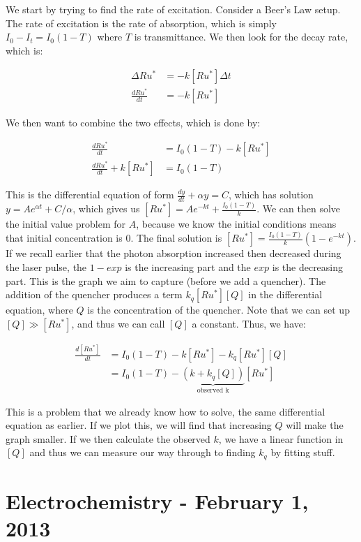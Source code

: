 \documentclass{report}
\begin{document}
We start by trying to find the rate of excitation. Consider a Beer's Law setup. The rate of excitation is the rate of absorption, which is simply $I_0 - I_t = I_0(1-T)$ where $T$ is transmittance. We then look for the decay rate, which is:

\begin{align*}
\Delta Ru^* &= -k[Ru^*]\Delta t\\
\frac{dRu^*}{dt} &= -k[Ru^*]
\end{align*}

We then want to combine the two effects, which is done by:

\begin{align*}
\frac{dRu^*}{dt} &= I_0(1-T) - k[Ru^*]\\
\frac{dRu^*}{dt} + k[Ru^*] &= I_0(1-T)
\end{align*}

This is the differential equation of form $\frac{dy}{dt} + \alpha y = C$, which has solution $y = Ae^{\alpha t} + C/\alpha$, which gives us $[Ru^*] = Ae^{-kt} + \frac{I_0(1-T)}{k}$. We can then solve the initial value problem for $A$, because we know the initial conditions means that initial concentration is $0$. The final solution is $[Ru^*] = \frac{I_0(1-T)}{k}(1-e^{-kt})$. If we recall earlier that the photon absorption increased then decreased during the laser pulse, the $1-exp$ is the increasing part and the $exp$ is the decreasing part. This is the graph we aim to capture (before we add a quencher). The addition of the quencher produces a term $k_q[Ru^*][Q]$ in the differential equation, where $Q$ is the concentration of the quencher. Note that we can set up $[Q] \gg [Ru^*]$, and thus we can call $[Q]$ a constant. Thus, we have:

\begin{align*}
\frac{d[Ru^*]}{dt} &= I_0(1-T) - k[Ru^*] - k_q[Ru^*][Q]\\
&= I_0(1-T) - \underbrace{(k + k_q[Q])}_{\text{observed k}}[Ru^*]
\end{align*}

This is a problem that we already know how to solve, the same differential equation as earlier. If we plot this, we will find that increasing $Q$ will make the graph smaller. If we then calculate the observed $k$, we have a linear function in $[Q]$ and thus we can measure our way through to finding $k_q$ by fitting stuff. 

\section{Electrochemistry - February 1, 2013}
\end{document}
